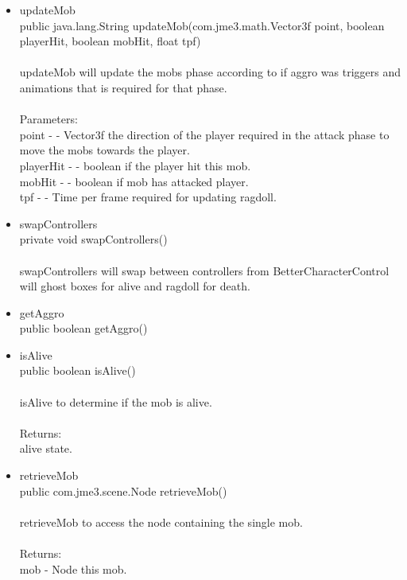 \documentclass[letterpaper]{article}
\begin{document}
\begin{itemize}
\begin{itemize}
											\item	updateMob \\
													public java.lang.String updateMob(com.jme3.math.Vector3f point,
													                         boolean playerHit,
													                         boolean mobHit,
													                         float tpf) \\ \\
													updateMob will update the mobs phase according to if aggro was triggers and animations that is required for that phase. \\ \\
													Parameters: \\
													point - - Vector3f the direction of the player required in the attack phase to move the mobs towards the player. \\
													playerHit - - boolean if the player hit this mob. \\
													mobHit - - boolean if mob has attacked player. \\
													tpf - - Time per frame required for updating ragdoll. \\
											\item	swapControllers \\
													private void swapControllers() \\ \\
													swapControllers will swap between controllers from BetterCharacterControl will ghost boxes for alive and ragdoll for death. \\
											\item	getAggro \\
													public boolean getAggro() \\
											\item	isAlive \\
													public boolean isAlive() \\ \\
													isAlive to determine if the mob is alive. \\ \\
													Returns: \\
													alive state. \\
											\item	retrieveMob \\
													public com.jme3.scene.Node retrieveMob() \\ \\
													retrieveMob to access the node containing the single mob. \\ \\
													Returns: \\
													mob - Node this mob.
										\end{itemize}
							\end{itemize}
							
\end{document}
